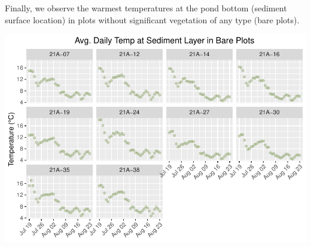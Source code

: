 \documentclass[
]{article}
\begin{document}
Finally, we observe the warmest temperatures at the pond bottom
(sediment surface location) in plots without significant vegetation of
any type (bare plots).

\includegraphics{iButtons2022-2-17_files/figure-latex/unnamed-chunk-29-1.pdf}
\end{document}
